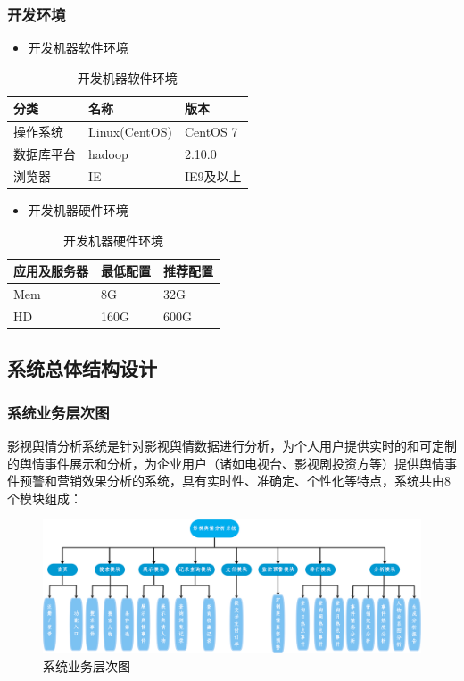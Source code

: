 \subsubsection{开发环境}
\begin{itemize}
	\item 开发机器软件环境
\end{itemize}
\begin{table}[!htbp]
	\centering
	\caption{开发机器软件环境}
	\label{tab:my-table2}
	\begin{tabular}{|l|l|l|}
		\hline
		分类 & 名称 & 版本 \\ \hline
		操作系统 & Linux(CentOS) & CentOS 7  \\ \hline
		数据库平台 & hadoop & 2.10.0  \\ \hline
		浏览器 & IE & IE9及以上  \\ \hline
	\end{tabular}
\end{table}
\begin{itemize}
	\item 开发机器硬件环境
\end{itemize}	
\begin{table}[!htbp]
	\centering
	\caption{开发机器硬件环境}
	\label{tab:my-table3}
	\begin{tabular}{|l|l|l|}
		\hline
		应用及服务器 & 最低配置 & 推荐配置 \\ \hline
		Mem & 8G & 32G \\ \hline
		HD & 160G & 600G \\ \hline
	\end{tabular}
\end{table}

\subsection{系统总体结构设计}

\subsubsection{系统业务层次图}
影视舆情分析系统是针对影视舆情数据进行分析，为个人用户提供实时的和可定制的舆情事件展示和分析，为企业用户（诸如电视台、影视剧投资方等）提供舆情事件预警和营销效果分析的系统，具有实时性、准确定、个性化等特点，系统共由8个模块组成：
\begin{figure}[!htbp]
	\centering
	\includegraphics[scale=0.4]{image/o1.png}
	\caption{系统业务层次图}
\end{figure}


